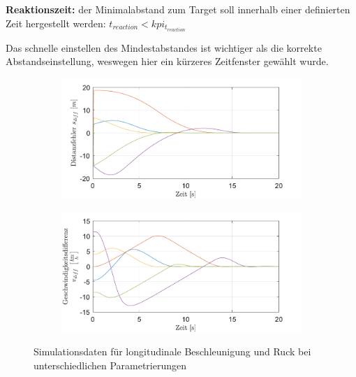 \medskip\noindent\textbf{Reaktionszeit:} der Minimalabstand zum Target soll innerhalb einer definierten Zeit hergestellt werden: $t_{reaction} < kpi_{t_{reaction}}$

\noindent Das schnelle einstellen des Mindestabstandes ist wichtiger als die korrekte Abstandseinstellung, weswegen hier ein kürzeres Zeitfenster gewählt wurde.
\begin{figure}
    \centering
    \begin{subfigure}[b]{.49\textwidth}
        \centering
        \includegraphics[width=\textwidth]{figures/3_Implementierung/ACC_Vel_Const/ACC_Vel_Const_s-Diff.pdf}
    \end{subfigure}
    \hfill
    \begin{subfigure}[b]{.49\textwidth}
        \centering
        \includegraphics[width=\textwidth]{figures/3_Implementierung/ACC_Vel_Const/ACC_Vel_Const_v-Diff.pdf}
    \end{subfigure}
    \caption{Simulationsdaten für longitudinale Beschleunigung und Ruck bei unterschiedlichen Parametrierungen}
    \label{fig:ACC_KPI_s_v}
\end{figure}